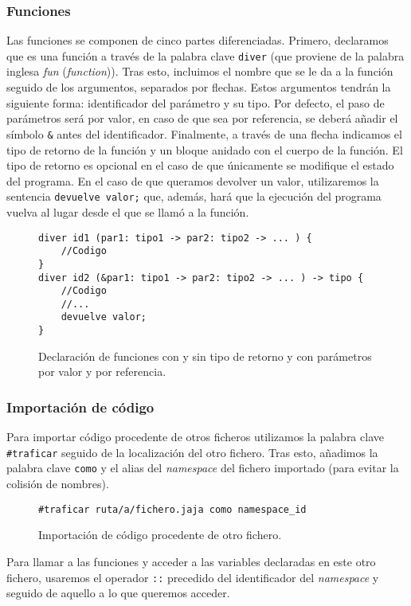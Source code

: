\subsubsection{Funciones}
Las funciones se componen de cinco partes diferenciadas. Primero, declaramos que
es una función a través de la palabra clave \lstinline{diver} (que proviene de
la palabra inglesa \textit{fun} (\textit{function})). Tras esto, incluimos el
nombre que se le da a la función seguido de los argumentos, separados por
flechas. Estos argumentos tendrán la siguiente forma: identificador del
parámetro y su tipo. Por defecto, el paso de parámetros será por valor, en caso
de que sea por referencia, se deberá añadir el símbolo \lstinline{&} antes del
identificador. Finalmente, a través de una flecha indicamos el tipo de retorno
de la función y un bloque anidado con el cuerpo de la función. El tipo de
retorno es opcional en el caso de que únicamente se modifique el estado del
programa. En el caso de que queramos devolver un valor, utilizaremos la
sentencia \lstinline{devuelve valor;} que, además, hará que la ejecución del
programa vuelva al lugar desde el que se llamó a la función.
\begin{figure}[htbp]
    \centering
    \begin{lstlisting}
diver id1 (par1: tipo1 -> par2: tipo2 -> ... ) {
    //Codigo
}
diver id2 (&par1: tipo1 -> par2: tipo2 -> ... ) -> tipo {
    //Codigo
    //...
    devuelve valor;
}
    \end{lstlisting}
    \caption{Declaración de funciones con y sin tipo de retorno y con parámetros
    por valor y por referencia.}
\end{figure}

\subsubsection{Importación de código}
Para importar código procedente de otros ficheros utilizamos la palabra clave
\lstinline{#traficar} seguido de la localización del otro fichero. Tras esto,
añadimos la palabra clave \lstinline{como} y el alias del \textit{namespace} del
fichero importado (para evitar la colisión de nombres).
\begin{figure}[htbp]
    \centering
    \begin{lstlisting}
#traficar ruta/a/fichero.jaja como namespace_id
    \end{lstlisting}
    \caption{Importación de código procedente de otro fichero.}
\end{figure}
Para llamar a las funciones y acceder a las variables declaradas en este otro
fichero, usaremos el operador \lstinline{::} precedido del identificador del
\textit{namespace} y seguido de aquello a lo que queremos acceder.

